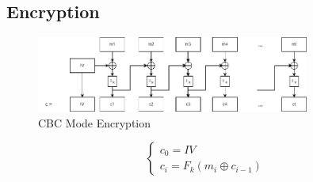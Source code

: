 \documentclass{scribe}
\begin{document}
\subsection{Encryption}
\begin{figure}[H]
  \centering
  \includegraphics[width=0.8\textwidth]{cbc.jpg}
  \caption{CBC Mode Encryption}
\end{figure}
\begin{equation}
    \begin{cases}
      c_0 = IV\\
      c_i = F_k(m_i \oplus c_{i-1})
    \end{cases}
\end{equation}
\end{document}
